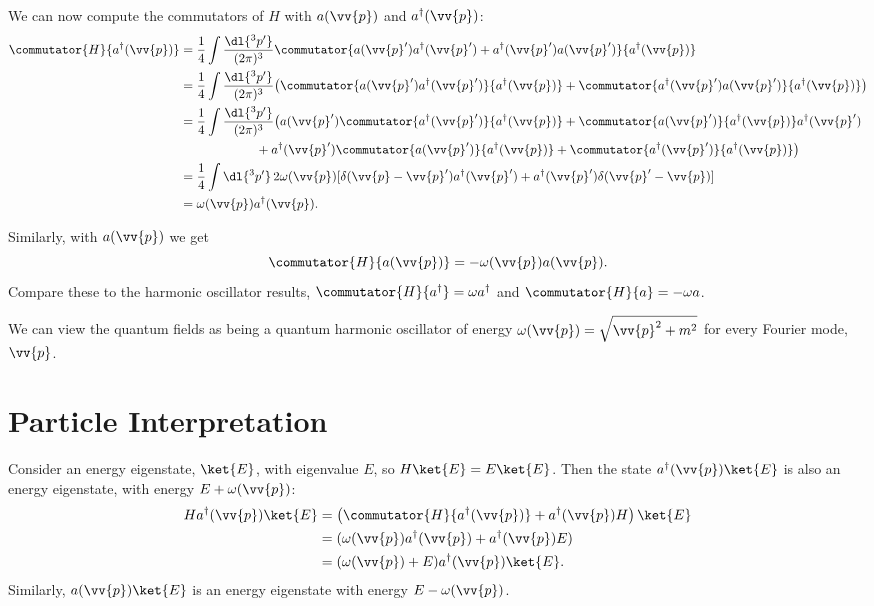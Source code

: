 \documentclass[fleqn]{NotesClass}
\newcommand{\hermit}{{\dagger}}
\begin{document}
    We can now compute the commutators of \(H\) with \(a(\vv{p})\) and \(a^\hermit(\vv{p})\):
    \begin{align}
        \commutator{H}{a^\hermit(\vv{p})} &= \frac{1}{4} \int \frac{\dl{^3p'}}{(2\pi)^3} \commutator{a(\vv{p}')a^\hermit(\vv{p}') + a^\hermit(\vv{p}')a(\vv{p}')}{a^\hermit(\vv{p})}\\
        &= \frac{1}{4} \int \frac{\dl{^3p'}}{(2\pi)^3} \big( \commutator{a(\vv{p}')a^\hermit(\vv{p}')}{a^\hermit(\vv{p})} + \commutator{a^\hermit(\vv{p}')a(\vv{p}')}{a^\hermit(\vv{p})}  \big) \notag\\
        &= \frac{1}{4} \int \frac{\dl{^3p'}}{(2\pi)^3} \big( a(\vv{p}')\commutator{a^\hermit(\vv{p}')}{a^\hermit(\vv{p})} + \commutator{a(\vv{p}')}{a^\hermit(\vv{p})}a^\hermit(\vv{p}') \notag\\
        &\qquad\qquad\qquad+ a^\hermit(\vv{p}')\commutator{a(\vv{p}')}{a^\hermit(\vv{p})} + \commutator{a^\hermit(\vv{p}')}{a^\hermit(\vv{p})} \big)\\
        &= \frac{1}{4} \int \dl{^3p'} \, 2\omega(\vv{p}) [ \delta(\vv{p} - \vv{p}')a^\hermit(\vv{p}') + a^\hermit(\vv{p}') \delta(\vv{p}' - \vv{p}) ]\\
        &= \omega(\vv{p})a^\hermit(\vv{p}).
    \end{align}
    
    Similarly, with \(a(\vv{p})\) we get
    \begin{equation}
        \commutator{H}{a(\vv{p})} = -\omega(\vv{p})a(\vv{p}).
    \end{equation}
    Compare these to the harmonic oscillator results, \(\commutator{H}{a^\hermit} = \omega a^\hermit\) and \(\commutator{H}{a} = -\omega a\).
    
    We can view the quantum fields as being a quantum harmonic oscillator of energy \(\omega(\vv{p}) = \sqrt{\vv{p}^2 + m^2}\) for every Fourier mode, \(\vv{p}\).
    
    \section{Particle Interpretation}
    Consider an energy eigenstate, \(\ket{E}\), with eigenvalue \(E\), so \(H\ket{E} = E\ket{E}\).
    Then the state \(a^\hermit(\vv{p})\ket{E}\) is also an energy eigenstate, with energy \(E + \omega(\vv{p})\):
    \begin{align}
        Ha^\hermit(\vv{p})\ket{E} &= \left( \commutator{H}{a^\hermit(\vv{p})} + a^\hermit(\vv{p})H \right)\ket{E}\\
        &= (\omega(\vv{p})a^\hermit(\vv{p}) + a^\hermit(\vv{p})E)\\
        &= (\omega(\vv{p}) + E)a^\hermit(\vv{p})\ket{E}.
    \end{align}
    Similarly, \(a(\vv{p})\ket{E}\) is an energy eigenstate with energy \(E - \omega(\vv{p})\).
    
\end{document}
